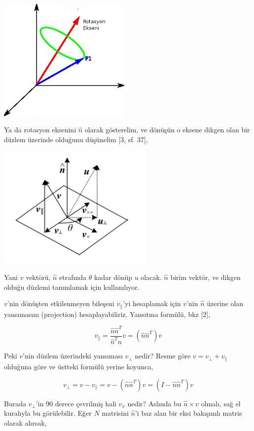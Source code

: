 \documentclass[12pt,fleqn]{article}\usepackage{../../common}
\begin{document}
\includegraphics[height=6cm]{rotation.png}

Ya da rotasyon eksenini $\hat{n}$ olarak gösterelim, ve dönüşün o eksene
dikgen olan bir düzlem üzerinde olduğunu düşünelim [3, sf. 37],

\includegraphics[height=6cm]{rotation2.png}

Yani $v$ vektörü, $\hat{n}$ etrafında $\theta$ kadar dönüp $u$ olacak. $\hat{n}$ birim vektör, 
ve dikgen olduğu düzlemi tanımlamak için kullanılıyor.

$v$'nin dönüşten etkilenmeyen bileşeni $v_\parallel$'yi hesaplamak için
$v$'nin $\hat{n}$ üzerine olan yansımasını (projection) hesaplayabiliriz. 
Yansıtma formülü, bkz [2],

$$ v_\parallel =  \frac{\hat{n}\hat{n}^T}{\hat{n}^T\hat{n}} v 
= (\hat{n}\hat{n}^T) v
$$

Peki $v$'nin düzlem üzerindeki yansıması $v_\perp$ nedir? Resme göre $v =
v_\perp + v_\parallel$ olduğuna göre ve üstteki formülü yerine koyunca,

$$ v_\perp = v - v_\parallel 
= v - (\hat{n}\hat{n}^T) v 
= (I - \hat{n}\hat{n}^T) v
$$

Burada $v_\perp$'in 90 derece çevrilmiş hali $v_x$ nedir? Aslında bu
$\hat{n} \times v$ olmalı, sağ el kuralıyla bu görülebilir. Eğer $N$
matrisini $\hat{n}$'i baz alan bir eksi bakışımlı matris olarak alırsak, 
\end{document}
